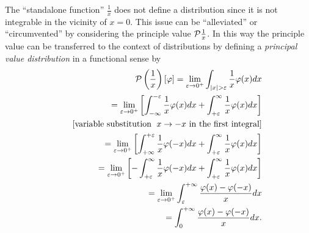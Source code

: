The ``standalone function'' $\frac{1}{x}$
does not define a distribution  since it is not integrable in
the vicinity of $x=0$.
This issue can be ``alleviated'' or ``circumvented''  by considering the principle value  ${\cal P}\frac{1}{x}$.
In this way the
principle value can be transferred to the context of distributions
by defining
a {\em principal value distribution} in a functional sense by
\begin{equation}
\begin{split}
{\cal P} \left(\frac{1}{x}\right) \left[\varphi\right]
=
\lim_{\varepsilon \rightarrow 0^+}
\int_{ \vert x \vert > \varepsilon }   \frac{1}{x}\varphi(x) dx
\\
\qquad
= \lim_{\varepsilon \rightarrow 0^+}
\left[
\int_{-\infty}^{ -\varepsilon} \frac{1}{x}\varphi(x) dx
+
\int_{ +\varepsilon}^{\infty} \frac{1}{x}\varphi(x) dx
\right]
\\
\qquad
[\textrm{variable substitution } \; x\rightarrow -x \textrm{ in the first integral}]
\\
\qquad
= \lim_{\varepsilon \rightarrow 0^+}
\left[
\int_{+\infty}^{ +\varepsilon} \frac{1}{x}\varphi(-x) dx
+
\int_{ +\varepsilon}^{\infty} \frac{1}{x}\varphi(x) dx
\right]
\\
\qquad
= \lim_{\varepsilon \rightarrow 0^+}
\left[
-\int_{ +\varepsilon}^{\infty} \frac{1}{x}\varphi(-x) dx
+
\int_{ +\varepsilon}^{\infty} \frac{1}{x}\varphi(x) dx
\right]
\\
\qquad
=
\lim_{\varepsilon \rightarrow 0^+}
\int_{\varepsilon}^{+\infty}   \frac{\varphi(x)-\varphi(-x)}{x} dx
\\
\qquad
=
\int_{0}^{+\infty}   \frac{\varphi(x)-\varphi(-x)}{x} dx
.
\end{split}
\label{2012-m-ch-di-prinvaldi}
\end{equation}




